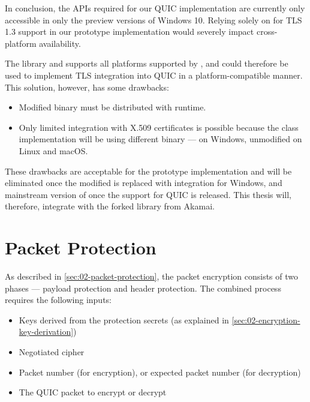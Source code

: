 In conclusion, the APIs required for our QUIC implementation are currently only accessible in only
the preview versions of Windows 10. Relying solely on \libschannel{} for TLS 1.3 support in our
prototype implementation would severely impact cross-platform availability.

The \libopenssl{} library and supports all platforms supported by \dotnet{}, and could therefore be
used to implement TLS integration into QUIC in a platform-compatible manner. This solution, however,
has some drawbacks:

\begin{itemize}

  \item Modified \libopenssl{} binary must be distributed with \dotnet{} runtime.

  \item Only limited integration with X.509 certificates is possible because the
 class implementation will be using different binary --- 
on Windows, unmodified \libopenssl{} on Linux and macOS.

\end{itemize}

These drawbacks are acceptable for the prototype implementation and will be eliminated once the
modified \libopenssl{} is replaced with \libschannel{} integration for Windows, and mainstream
version of \libopenssl{} once the support for QUIC is released. This thesis will, therefore,
integrate with the forked \libopenssl{} library from Akamai.

\section{Packet Protection}\label{sec:03-packet-protection}

As described in \autoref{sec:02-packet-protection}, the packet encryption consists of two phases ---
payload protection and header protection. The combined process requires the following inputs:

\begin{itemize}

  \item Keys derived from the protection secrets (as explained in
\autoref{sec:02-encryption-key-derivation})

  \item Negotiated cipher

  \item Packet number (for encryption), or expected packet number (for decryption)

  \item The QUIC packet to encrypt or decrypt

\end{itemize}

